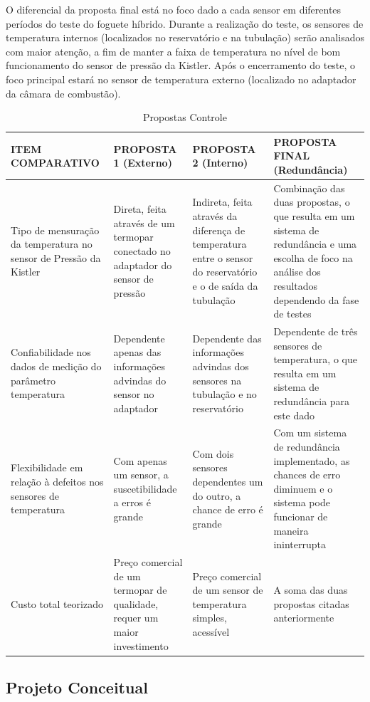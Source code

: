 O diferencial da proposta final está no foco dado a cada sensor em diferentes períodos do teste do foguete híbrido. Durante a realização do teste, os sensores de temperatura internos (localizados no reservatório e na tubulação) serão analisados com maior atenção, a fim de manter a faixa de temperatura no nível de bom funcionamento do sensor de pressão da Kistler. Após o encerramento do teste, o foco principal estará no sensor de temperatura externo (localizado no adaptador da câmara de combustão).
\newpage
\begin{table}[]
    \centering
    \begin{tabular}{|p{3cm}|p{3cm}|p{3cm}|p{3cm}|}
    \hline
    \textbf{ITEM COMPARATIVO} & \textbf{PROPOSTA 1 (Externo)}    & \textbf{PROPOSTA 2 (Interno)} & \textbf{PROPOSTA FINAL (Redundância)}  \\ \hline
    Tipo de mensuração da temperatura no sensor de Pressão da Kistler      & Direta, feita através de um termopar conectado no adaptador do sensor de pressão &  Indireta, feita através da diferença de temperatura entre o sensor do reservatório e o de saída da tubulação &  Combinação das duas propostas, o que resulta em um sistema de redundância e uma escolha de foco na análise dos resultados dependendo da fase de testes  \\ \hline
    Confiabilidade nos dados de medição do parâmetro temperatura & Dependente apenas das informações advindas do sensor no adaptador & Dependente das informações advindas dos sensores na tubulação e no reservatório & Dependente de três sensores de temperatura, o que resulta em um sistema de redundância para este dado \\ \hline
    Flexibilidade em relação à defeitos nos sensores de temperatura & Com apenas um sensor, a suscetibilidade a erros é grande & Com dois sensores dependentes um do outro, a chance de erro é grande & Com um sistema de redundância implementado, as chances de erro diminuem e o sistema pode funcionar de maneira ininterrupta \\ \hline
    Custo total teorizado & Preço comercial de um termopar de qualidade, requer um maior investimento & Preço comercial de um sensor de temperatura simples, acessível & A soma das duas propostas citadas anteriormente \\ \hline
    \end{tabular}
    \caption{Propostas Controle}
    \end{table}

\subsection{Projeto Conceitual}

